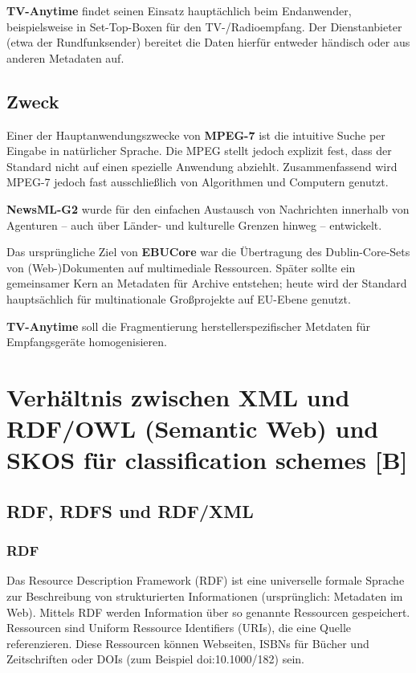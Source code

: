 	\textbf{TV-Anytime} findet seinen Einsatz hauptächlich beim Endanwender, beispielsweise in Set-Top-Boxen für den TV-/Radioempfang. Der Dienstanbieter (etwa der Rundfunksender) bereitet die Daten hierfür entweder händisch oder aus anderen Metadaten auf.

	\subsection{Zweck}
	Einer der Hauptanwendungszwecke von \textbf{MPEG-7} ist die intuitive Suche per Eingabe in natürlicher Sprache. Die MPEG stellt jedoch explizit fest, dass der Standard nicht auf einen spezielle Anwendung abziehlt. Zusammenfassend wird MPEG-7 jedoch fast ausschließlich von Algorithmen und Computern genutzt.

	\textbf{NewsML-G2} wurde für den einfachen Austausch von Nachrichten innerhalb von Agenturen -- auch über Länder- und kulturelle Grenzen hinweg -- entwickelt. 
	
	Das ursprüngliche Ziel von \textbf{EBUCore} war die Übertragung des Dublin-Core-Sets von (Web-)Dokumenten auf multimediale Ressourcen. Später sollte ein gemeinsamer Kern an Metadaten für Archive entstehen; heute wird der Standard hauptsächlich für multinationale Großprojekte auf EU-Ebene genutzt. 
	
	\textbf{TV-Anytime} soll die Fragmentierung herstellerspezifischer Metdaten für Empfangsgeräte homogenisieren. 
	
	\section{Verhältnis zwischen XML und RDF/OWL (Semantic Web) und SKOS für classification schemes [B]}
	\subsection{RDF, RDFS und RDF/XML}
	\subsubsection{RDF}
	Das Resource Description Framework (RDF) ist eine universelle formale Sprache zur Beschreibung von strukturierten Informationen (ursprünglich: Metadaten im Web). Mittels RDF werden Information über so genannte Ressourcen gespeichert. Ressourcen sind Uniform Ressource Identifiers (URIs), die eine Quelle referenzieren. Diese Ressourcen können Webseiten, ISBNs für Bücher und Zeitschriften oder DOIs (zum Beispiel doi:10.1000/182) sein.
	
